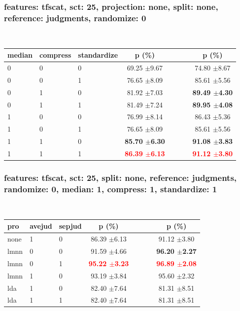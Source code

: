 \documentclass{beamer}
\begin{document}
\begin{frame}\frametitle{features: tfscat, sct: 25, projection: none, split: none, reference: judgments, randomize: 0}  
 
\begin{table}  
\begin{center}  
\  
\setlength{\tabcolsep}{.16667em}  
\begin{tabular}{lllccccc}  
median & compress & standardize & p (\%) &  &  &  & p (\%) \\  
\hline  
0 & 0 & 0 & 69.25 $\pm$9.67 &  &  &  & 74.80 $\pm$8.67 \\  
0 & 0 & 1 & 76.65 $\pm$8.09 &  &  &  & 85.61 $\pm$5.56 \\  
0 & 1 & 0 & 81.92 $\pm$7.03 &  &  &  & \textbf{89.49 $\pm$4.30} \\  
0 & 1 & 1 & 81.49 $\pm$7.24 &  &  &  & \textbf{89.95 $\pm$4.08} \\  
1 & 0 & 0 & 76.99 $\pm$8.14 &  &  &  & 86.43 $\pm$5.36 \\  
1 & 0 & 1 & 76.65 $\pm$8.09 &  &  &  & 85.61 $\pm$5.56 \\  
1 & 1 & 0 & \textbf{85.70 $\pm$6.30} &  &  &  & \textbf{91.08 $\pm$3.83} \\  
1 & 1 & 1 & \textbf{\textcolor{red}{86.39 $\pm$6.13}} &  &  &  & \textbf{\textcolor{red}{91.12 $\pm$3.80}} \\  
\end{tabular}  
\end{center}  
\label{fetfSc25PrnoSpnoRejuRa0}  
\end{table}  
 
\end{frame}   
\begin{frame}\frametitle{features: tfscat, sct: 25, split: none, reference: judgments, randomize: 0, median: 1, compress: 1, standardize: 1} 
  
\begin{table} 
\begin{center} 
\ 
 \setlength{\tabcolsep}{.16667em} 
\begin{tabular}{lllccccc} 
pro & avejud & sepjud & p (\%) &  &  &  & p (\%) \\ 
\hline 
none & 1 & 0 & 86.39 $\pm$6.13 &  &  &  & 91.12 $\pm$3.80 \\ 
lmnn & 0 & 0 & 91.59 $\pm$4.66 &  &  &  & \textbf{96.20 $\pm$2.27} \\ 
lmnn & 0 & 1 & \textbf{\textcolor{red}{95.22 $\pm$3.23}} &  &  &  & \textbf{\textcolor{red}{96.89 $\pm$2.08}} \\ 
lmnn & 1 & 0 & 93.19 $\pm$3.84 &  &  &  & 95.60 $\pm$2.32 \\ 
lda & 1 & 0 & 82.40 $\pm$7.64 &  &  &  & 81.31 $\pm$8.51 \\ 
lda & 1 & 1 & 82.40 $\pm$7.64 &  &  &  & 81.31 $\pm$8.51 \\ 
\end{tabular} 
\end{center} 
\label{fetfSc25SpnoRejuRa0Me1Co1St1} 
\end{table} 
 
\end{frame}  
 
 
            
            
 
\end{document}
